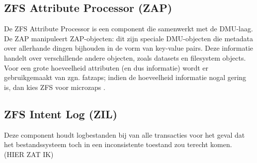 \subsection{ZFS Attribute Processor (ZAP)}

De ZFS Attribute Processor is een component die samenwerkt met de DMU-laag. De ZAP manipuleert ZAP-objecten: dit zijn speciale DMU-objecten die metadata over allerhande dingen bijhouden in de vorm van key-value pairs. Deze informatie handelt over verschillende andere objecten, zoals datasets en filesystem objects. Voor een grote hoeveelheid attributen (en dus informatie) wordt er gebruikgemaakt van zgn. fatzaps; indien de hoeveelheid informatie nogal gering is, dan kies ZFS voor microzaps \autocite{Microsystems2006}.

\subsection{ZFS Intent Log (ZIL)}

Deze component houdt logbestanden bij van alle transacties voor het geval dat het bestandssysteem toch in een inconsistente toestand zou terecht komen. (HIER ZAT IK) 

